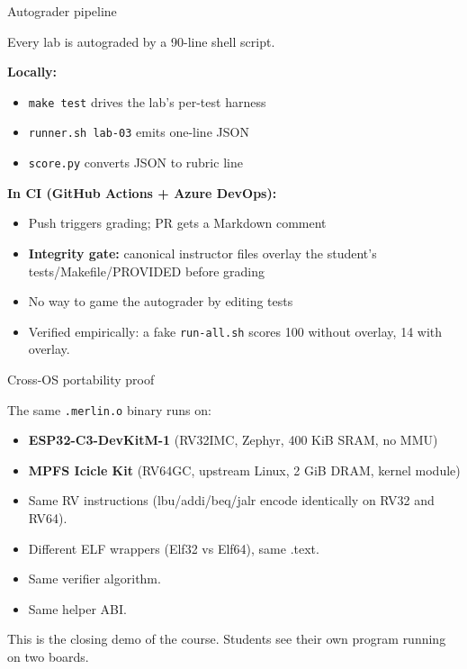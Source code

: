 \documentclass[aspectratio=169,11pt]{beamer}
\begin{document}
\begin{frame}{Autograder pipeline}

Every lab is autograded by a 90-line shell script.

\textbf{Locally:}
\begin{itemize}
  \item \texttt{make test} drives the lab's per-test harness
  \item \texttt{runner.sh lab-03} emits one-line JSON
  \item \texttt{score.py} converts JSON to rubric line
\end{itemize}

\pause

\textbf{In CI (GitHub Actions + Azure DevOps):}
\begin{itemize}
  \item Push triggers grading; PR gets a Markdown comment
  \item \textbf{Integrity gate:} canonical instructor files
        overlay the student's tests/Makefile/PROVIDED before
        grading
  \item No way to game the autograder by editing tests
  \item Verified empirically: a fake \texttt{run-all.sh}
        scores 100 without overlay, 14 with overlay.
\end{itemize}

\end{frame}

\begin{frame}{Cross-OS portability proof}

The same \texttt{.merlin.o} binary runs on:

\begin{itemize}
  \item \textbf{ESP32-C3-DevKitM-1} (RV32IMC, Zephyr,
        400 KiB SRAM, no MMU)
  \item \textbf{MPFS Icicle Kit} (RV64GC, upstream Linux,
        2 GiB DRAM, kernel module)
\end{itemize}

\pause

\begin{itemize}
  \item Same RV instructions (lbu/addi/beq/jalr encode
        identically on RV32 and RV64).
  \item Different ELF wrappers (Elf32 vs Elf64), same .text.
  \item Same verifier algorithm.
  \item Same helper ABI.
\end{itemize}

\pause

This is the closing demo of the course.  Students see their
own program running on two boards.

\end{frame}
\end{document}
